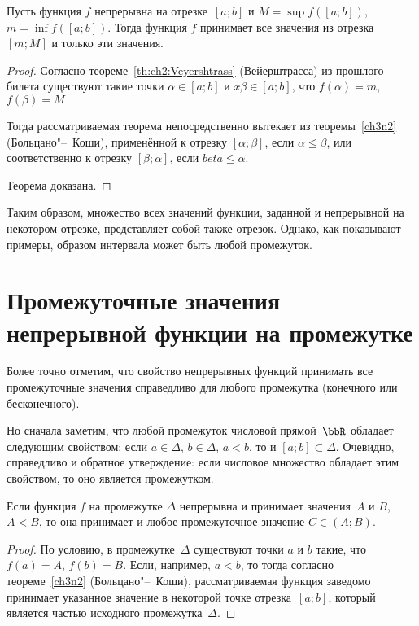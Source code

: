\begin{thm}
Пусть функция $f$ непрерывна на отрезке~$[a;b]$ и $M=\sup f([a;b]) $, $m=\inf f([a;b])$. Тогда функция $f$ принимает все значения из отрезка $[m;M]$ и только эти значения.
\end{thm}
\begin{proof}
Согласно теореме~\ref{th:ch2:Veyershtrass} (Вейерштрасса) из прошлого билета существуют такие точки $\alpha\in [a;b]$ и $x\beta\in [a;b]$, что $f(\alpha)=m$, $f(\beta)=M$

Тогда рассматриваемая теорема непосредственно вытекает из теоремы~\ref{ch3n2} (Больцано"--~Коши), применённой к отрезку $[\alpha;\beta]$, если $\alpha \le \beta$, или соответственно к отрезку $[\beta;\alpha]$, если $beta \le \alpha$. 

Теорема доказана.
\end{proof} 

Таким образом, множество всех значений функции, заданной и непрерывной на некотором отрезке, представляет собой также отрезок. Однако, как показывают примеры, образом интервала может быть любой промежуток.

\section{Промежуточные значения непрерывной функции на промежутке}

Более точно отметим, что свойство непрерывных функций принимать все промежуточные значения справедливо для любого промежутка (конечного или бесконечного).

Но сначала заметим, что любой промежуток числовой прямой~$\bbR$ обладает следующим свойством: если $a\in\Delta$, $b\in\Delta$, $a<b$, то и $[a;b] \subset \Delta$. Очевидно, справедливо и обратное утверждение: если числовое множество обладает этим свойством, то оно является промежутком.

\begin{thm}
Если функция $f$ на промежутке $\Delta$ непрерывна и принимает значения~$A$ и $B$, $A<B$,  то она принимает и любое промежуточное значение $C\in (A;B)$.
\end{thm}
\begin{proof}
По условию, в промежутке~$\Delta$ существуют точки $a$ и $b$ такие, что $f(a) = A$, $f(b) = B$. Если, например, $a<b$, то тогда согласно теореме~\ref{ch3n2} (Больцано"--~Коши), рассматриваемая функция заведомо принимает указанное значение в некоторой точке отрезка~$[a;b]$, который является частью исходного промежутка~$\Delta$.
\end{proof} 

